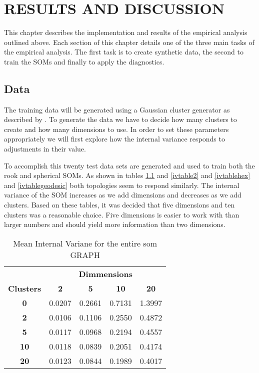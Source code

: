 \chapter{RESULTS AND DISCUSSION}
This chapter describes the implementation and results of the empirical analysis
outlined above.  Each section of this chapter details one of the three main
tasks of the empirical analysis.  The first task is to create synthetic data,
the second to train the SOMs and finally to apply the diagnostics.

\section{Data}
The training data will be generated using a Gaussian cluster generator as
described by \cite{handl}.  To generate the data we have to decide how many
clusters to create and how many dimensions to use.  In order to set these
parameters appropriately we will first explore how the internal variance
responds to adjustments in their value.

To accomplish this twenty test data sets are generated and used to train both
the rook and spherical SOMs. As shown in tables \ref{ivtable1} and
\ref{ivtable2} and \ref{ivtablehex} and \ref{ivtablegeodesic} both topologies seem to respond similarly. The internal
variance of the SOM increases as we add dimensions and decreases as we add
clusters. Based on these tables, it was decided that five dimensions and ten
clusters was a reasonable choice. Five dimensions is easier to work with than
larger numbers and should yield more information than two dimensions. 


\begin{table}
\centering
\caption{Mean Internal Variane for the entire som GRAPH}
\label{ivtable1}
\begin{tabular}{|c||c|c|c|c|}
\hline
&\multicolumn{4}{c|}{\textbf{Dimmensions}}\\
\textbf{Clusters} & \multicolumn{1}{c}{\textbf{2}} &
\multicolumn{1}{c}{\textbf{5}} & \multicolumn{1}{c}{\textbf{10}} &
\multicolumn{1}{c|}{\textbf{20}}\\
\hline
\hline
\textbf{0} & 0.0207& 0.2661& 0.7131& 1.3997 \\
\hline
\textbf{2} & 0.0106& 0.1106& 0.2550& 0.4872 \\
\hline
\textbf{5} & 0.0117& 0.0968& 0.2194& 0.4557 \\
\hline
\textbf{10} & 0.0118& 0.0839& 0.2051& 0.4174 \\
\hline
\textbf{20} & 0.0123& 0.0844& 0.1989& 0.4017 \\
\hline
\end{tabular} \end{table}


